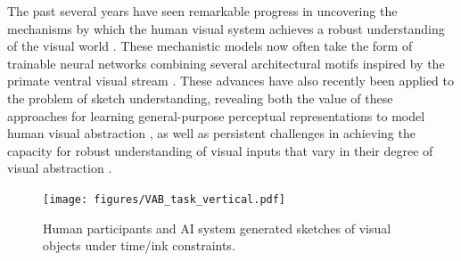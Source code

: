\documentclass[10pt,letterpaper]{article}
\begin{document}
The past several years have seen remarkable progress in uncovering the mechanisms by which the human visual system achieves a robust understanding of the visual world \cite{yamins2014performance, kriegeskorte2015deep, zhuang2021unsupervised, konkle2022self}. 
These mechanistic models now often take the form of trainable neural networks combining several architectural motifs inspired by the primate ventral visual stream 
\cite{gross1972visual,goodale1992separate,malach2002topography,hung2005fast}. %
These advances have also recently been applied to the problem of sketch understanding, revealing both the value of these approaches for learning general-purpose perceptual representations to model human visual abstraction \cite{fan2018common, yu2017sketch, kubilius2016deep}, as well as persistent challenges in achieving the capacity for robust understanding of visual inputs that vary in their degree of visual abstraction \cite{baker2018abstract, singer2022photos, fan2020pragmatic}.

\begin{figure}[ht!]
    \centering
    \texttt{[image: figures/VAB\_task\_vertical.pdf]}
    \vspace{-1em}
    \caption{Human participants and AI system generated sketches of visual objects under time/ink constraints.}
    \vspace{-2em}
    \label{fig:trial}
\end{figure}
\end{document}
